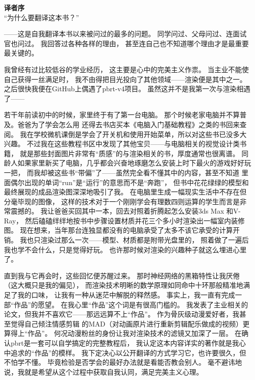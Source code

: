 {\Huge\bfseries 译者序}\vspace{30pt}\\

“为什么要翻译这本书？”

——这是自我翻译本书以来被问过的最多的问题。
同学问过、父母问过、连面试官也问过。
我回答过各种各样的理由，
甚至连自己也不知道哪个理由才是最重要最关键的。

我曾经有过比较低谷的学业经历，
这主要是心中的完美主义作祟。
当主业不能使自己获得一丝满足时，
我不由得把目光投向了其他领域——渲染便是其中之一。
之后很快我便在GitHub上偶遇了pbrt-v4项目。
虽然这并不是我第一次与渲染相遇了——

若干年前读初中的时候，家里终于有了第一台电脑。
那个时候老家电脑并不算普及。爸爸为了学会怎么用
还得去书店买本《电脑入门基础教程》之类的书回来查阅。
我在学校微机课倒是学会了开关机和使用开始菜单，所以对这些书已没多大兴趣。
不过我在这些教程书区中发现了其他宝贝——与电脑相关的视觉设计类书籍，
就是那些封面图片非常有“质感”的与渲染相关的书，厚度通常也很离谱。
同龄人如果家里新买了电脑，几乎都会兴奋地琢磨怎么安装上时下最火的游戏好好玩一把，
而我却被这些书“带偏”了——虽然完全看不懂其中的内容，甚至不知道
里面偶尔出现的单词“run”是“运行”的意思而不是“奔跑”，
但书中花花绿绿的模型和最终展现的成品渲染图深深地吸引了我。
在电脑里生成一幅现实生活中不存在但分毫毕现的图像，
这样的技术对于一个刚刚学会有理数四则运算的学生而言是非常震撼的。
我让爸爸买回其中一本，回去对照着折腾起怎么安装3ds Max\textsuperscript{\textregistered}
和V-Ray\textsuperscript{\textregistered}，
然后磕磕绊绊地按书中步骤设置材质并花三个多小时渲染出一幅室内装修图。
现在想来，当年那台连独显都没有的电脑承受了太多不该它承受的计算开销。
我也只渲染过那么一次——模型、材质都是附带光盘里的，
照着做了一遍后我也学不会什么，只是觉得好玩。
也许那时候对渲染的兴趣种子就这么埋进心里了。

直到我与它再会时，这些回忆便苏醒过来。
那时神经网络的黑箱特性让我厌倦（这大概只是我的偏见），
而渲染技术明晰的数学原理如同命中十环那般精准地满足了我的口味，
让我有一种从迷茫中解脱的释然感。
事实上，我一直有完成一部“作品”的愿望。
在我心里“作品”这个词是有很高门槛的。
我发表了主业相关的论文，但我并不喜欢它——那远远算不上“作品”。
作为骨灰级动漫爱好者，我甚至觉得自己倾注情感剪辑
的MAD（对动画原片进行重新剪辑配乐做成的视频）更算得上“作品”。
何况动漫粉丝的身份让我对渲染技术的滤镜又加深了一层。
在确认pbrt是一套可以自学搞定的完整教程后，
我认定这本内容详实的著作就是我心中追求的“作品”的模样。
我下定决心以公开翻译的方式学习它，也许要很久，但不怕学不懂。
毕竟检验是否学会的最好办法就是看能否教会别人。
毫不避讳地说，我就是希望从这个过程中获取自我认同，满足完美主义心理。

